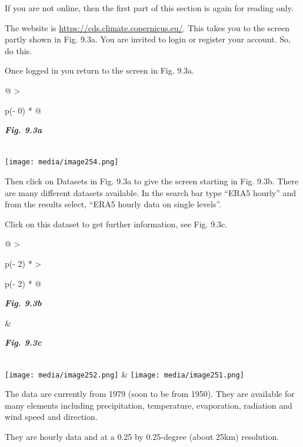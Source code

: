 \documentclass[
  letterpaper,
  DIV=11,
  numbers=noendperiod]{scrreprt}
\begin{document}
If you are not online, then the first part of this section is again for
reading only.

The website is \url{https://cds.climate.copernicus.eu/}. This takes you
to the screen partly shown in Fig. 9.3a. You are invited to login or
register your account. So, do this.

Once logged in you return to the screen in Fig. 9.3a.

\begin{longtable}[]{@{}
  >{\raggedright\arraybackslash}p{(\columnwidth - 0\tabcolsep) * }@{}}
\toprule\noalign{}
\begin{minipage}[b]{\linewidth}\raggedright
\textbf{\emph{Fig. 9.3a}}
\end{minipage} \\
\midrule\noalign{}
\endhead
\bottomrule\noalign{}
\endlastfoot
\texttt{[image: media/image254.png]} \\
\end{longtable}

Then click on Datasets in Fig. 9.3a to give the screen starting in Fig.
9.3b. There are many different datasets available. In the search bar
type ``ERA5 hourly'' and from the results select, ``ERA5 hourly data on
single levels''.

Click on this dataset to get further information, see Fig. 9.3c.

\begin{longtable}[]{@{}
  >{\raggedright\arraybackslash}p{(\columnwidth - 2\tabcolsep) * }
  >{\raggedright\arraybackslash}p{(\columnwidth - 2\tabcolsep) * }@{}}
\toprule\noalign{}
\begin{minipage}[b]{\linewidth}\raggedright
\textbf{\emph{Fig. 9.3b}}
\end{minipage} & \begin{minipage}[b]{\linewidth}\raggedright
\textbf{\emph{Fig. 9.3c}}
\end{minipage} \\
\midrule\noalign{}
\endhead
\bottomrule\noalign{}
\endlastfoot
\texttt{[image: media/image252.png]} &
\texttt{[image: media/image251.png]} \\
\end{longtable}

The data are currently from 1979 (soon to be from 1950). They are
available for many elements including precipitation, temperature,
evaporation, radiation and wind speed and direction.

They are hourly data and at a 0.25 by 0.25-degree (about 25km)
resolution.
\end{document}
